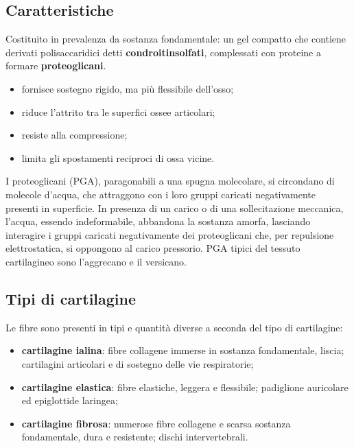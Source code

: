 \subsection{Caratteristiche}

Costituito in prevalenza da sostanza fondamentale: un gel compatto che contiene derivati polisaccaridici detti \textbf{condroitinsolfati}, complessati con proteine a formare \textbf{proteoglicani}.

\begin{itemize}
  \item fornisce sostegno rigido, ma più flessibile dell'osso;
  \item riduce l'attrito tra le superfici ossee articolari;
  \item resiste alla compressione;
  \item limita gli spostamenti reciproci di ossa vicine.
\end{itemize}

I proteoglicani (PGA), paragonabili a una spugna molecolare, si circondano di molecole d'acqua, che attraggono con i loro gruppi caricati negativamente presenti in superficie. In presenza di un carico o di una sollecitazione meccanica, l'acqua, essendo indeformabile, abbandona la sostanza amorfa, lasciando interagire i gruppi caricati negativamente dei proteoglicani che, per repulsione elettrostatica, si oppongono al carico pressorio. PGA tipici del tessuto cartilagineo sono l'aggrecano e il versicano.

\subsection{Tipi di cartilagine}

Le fibre sono presenti in tipi e quantità diverse a seconda del tipo di cartilagine:

\begin{itemize}
  \item \textbf{cartilagine ialina}: fibre collagene immerse in sostanza fondamentale, liscia; cartilagini articolari e di sostegno delle vie respiratorie;
  \item \textbf{cartilagine elastica}: fibre elastiche, leggera e flessibile; padiglione auricolare ed epiglottide laringea;
  \item \textbf{cartilagine fibrosa}: numerose fibre collagene e scarsa sostanza fondamentale, dura e resistente; dischi intervertebrali.
\end{itemize}

